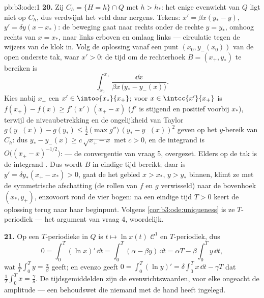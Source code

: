 \begin{solution}{pb:b3:ode:1}
\textbf{20.} Zij $C_h = \{H = h\}\cap Q$ met $h > h_*$: het enige
evenwicht van $Q$ ligt niet op $C_h$, dus verdwijnt het veld daar
nergens. Tekens: $x' = \beta x(y_* - y)$, $y' = \delta y(x -
x_*)$: de beweging gaat naar rechts onder de rechte $y = y_*$,
omhoog rechts van $x = x_*$, naar links erboven en omlaag links
--- circulatie tegen de wijzers van de klok in. Volg de oplossing
vanaf een punt $(x_0, y_-(x_0))$ van de open onderste tak, waar
$x' > 0$: de tijd om de rechterhoek $B = (x_+, y_*)$ te bereiken
is
\[
\int_{x_0}^{x_+}\frac{\dd x}{\beta x\,\bigl(y_* -
y_-(x)\bigr)} .
\]
Kies nabij $x_+$ een $x' \in \intoo{x_*}{x_+}$; voor $x \in
\intcc{x'}{x_+}$ is $f(x_+) - f(x) \geq f'(x')\,(x_+ - x)$ ($f'$
is stijgend en positief voorbij $x_*$), terwijl de
niveaubetrekking en de ongelijkheid van Taylor $g(y_-(x)) -
g(y_*) \leq \frac12\,\bigl(\max g''\bigr)\,(y_* - y_-(x))^2$
geven op het  $y$-bereik van $C_h$: dus $y_* - y_-(x)
\geq c\,\sqrt{x_+ - x}$ met $c > 0$, en de integrand is
$O\bigl((x_+ - x)^{-1/2}\bigr)$:  --- de convergentie
van vraag 5, overgezet. Elders op de tak is de integrand .
Dus wordt $B$ in eindige tijd bereikt; daar is $y' = \delta
y_*(x_+ - x_*) > 0$, gaat de  het gebied $x > x_*$, $y > y_*$
binnen, klimt ze met de symmetrische afschatting (de rollen van
$f$ en $g$ verwisseld) naar de bovenhoek $(x_*, y_+)$, enzovoort
rond de vier bogen: na een eindige tijd $T > 0$ keert de
oplossing terug naar haar beginpunt. Volgens
\cref{cor:b3:ode:uniqueness} is ze $T$-periodiek --- het argument
van vraag 4, woordelijk.

\textbf{21.} Op een $T$-periodieke  in $Q$ is $t \mapsto \ln
x(t)$ $\mathcal C^1$ en $T$-periodiek, dus
\[
0 = \int_0^T(\ln x)'\,\dd t
= \int_0^T(\alpha - \beta y)\,\dd t
= \alpha T - \beta\int_0^Ty\,\dd t ,
\]
wat $\frac1T\int_0^Ty = \frac\alpha\beta$ geeft; en evenzo geeft
$0 = \int_0^T(\ln y)' = \delta\int_0^Tx\,\dd t - \gamma T$ dat
$\frac1T\int_0^Tx = \frac\gamma\delta$. De tijdsgemiddelden zijn
de evenwichtswaarden, voor elke  ongeacht de amplitude ---
een behoudswet die niemand met de hand heeft ingelegd.


\end{solution}
